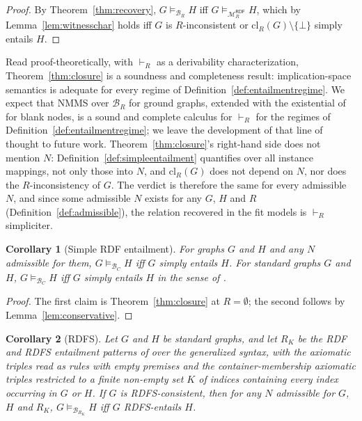 \documentclass[12pt]{article}
\newtheorem{corollary}{Corollary}
\theoremstyle{definition}
\newcommand{\bmap}{\mathfrak{B}}  %
\newcommand{\Mcal}{\mathcal{M}}   %
\newcommand{\Bcal}{\mathcal{B}}   %
\newcommand{\cl}{\mathrm{cl}}   %
\begin{document}
\begin{proof}
By Theorem~\ref{thm:recovery}, $G \models_{\Bcal_{R}} H$ iff $G \models_{\Mcal_{R}^{\mathsf{RDF}}} H$, which by Lemma~\ref{lem:witnesschar} holds iff $G$ is $R$-inconsistent or $\cl_R(G) \setminus \{\bot\}$ simply entails $H$.
\end{proof}

Read proof-theoretically, with $\vdash_{R}$ as a derivability characterization, Theorem~\ref{thm:closure} is a soundness and completeness result: implication-space semantics is adequate for every regime of Definition~\ref{def:entailmentregime}. We expect that NMMS \citep{hlobil2025reasons} over $\Bcal_{R}$ for ground graphs, extended with the existential of \citet{hlobil2026firstorder} for blank nodes, is a sound and complete calculus for $\vdash_{R}$ for the regimes of Definition~\ref{def:entailmentregime}; we leave the development of that line of thought to future work. Theorem~\ref{thm:closure}'s right-hand side does not mention $N$: Definition~\ref{def:simpleentailment} quantifies over all instance mappings, not only those into $N$, and $\cl_R(G)$ does not depend on $N$, nor does the $R$-inconsistency of $G$. The verdict is therefore the same for every admissible $N$, and since some admissible $N$ exists for any $G$, $H$ and $R$ (Definition~\ref{def:admissible}), the relation recovered in the fit models is $\vdash_{R}$ simpliciter.

\begin{corollary}[Simple RDF entailment]
\label{cor:simple}
For graphs $G$ and $H$ and any $N$ admissible for them, $G \models_{\Bcal_{C}} H$ iff $G$ simply entails $H$. For standard graphs $G$ and $H$, $G \models_{\Bcal_{C}} H$ iff $G$ simply entails $H$ in the sense of \citet{hayes2014rdf}.
\end{corollary}

\begin{proof}
The first claim is Theorem~\ref{thm:closure} at $R = \emptyset$; the second follows by Lemma~\ref{lem:conservative}.
\end{proof}

\begin{corollary}[RDFS]
\label{cor:rdfs}
Let $G$ and $H$ be standard graphs, and let $R_K$ be the RDF and RDFS entailment patterns of \citet[\S 9.2]{hayes2014rdf} over the generalized syntax, with the axiomatic triples read as rules with empty premises and the container-membership axiomatic triples restricted to a finite non-empty set $K$ of indices containing every index occurring in $G$ or $H$. If $G$ is RDFS-consistent, then for any $N$ admissible for $G$, $H$ and $R_K$, $G \models_{\Bcal_{R_K}} H$ iff $G$ RDFS-entails $H$.
\end{corollary}
\end{document}
